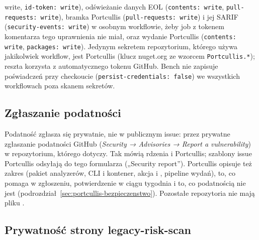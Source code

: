 \begin{itemize}
{        write}, \texttt{id-token: write}), odświeżanie danych EOL (\texttt{contents: write},
        \texttt{pull-requests: write}), bramka Portcullis (\texttt{pull-requests: write})
        i jej SARIF (\texttt{security-events: write}) w osobnym workflowie, żeby job
        z tokenem komentarza tego uprawnienia nie miał, oraz wydanie Portcullis
        (\texttt{contents: write}, \texttt{packages: write}). Jedynym sekretem
        repozytorium, którego używa jakikolwiek workflow, jest 
        Portcullis (klucz nuget.org ze wzorcem \texttt{Portcullis.*}); reszta korzysta
        z automatycznego tokenu GitHub. Bench nie zapisuje poświadczeń przy checkoucie
        (\texttt{persist-credentials: false}) we wszystkich workflowach poza skanem
        sekretów.
\end{itemize}


\subsection{Zgłaszanie podatności}\label{sec:bezpieczenstwo-zgloszenia}

Podatność zgłasza się prywatnie, nie w publicznym issue: przez prywatne zgłaszanie
podatności GitHub (\emph{Security → Advisories → Report a vulnerability}) w repozytorium,
którego dotyczy. Tak mówią  rdzenia i Portcullis; szablony issue
Portcullis odsyłają do tego formularza („Security report”). Portcullis opisuje też zakres
(pakiet analyzerów, CLI i kontener, akcja i , pipeline
wydań), to, co pomaga w zgłoszeniu, potwierdzenie w ciągu tygodnia i to, co podatnością nie
jest (podrozdział~\ref{sec:portcullis-bezpieczenstwo}). Pozostałe repozytoria nie mają
pliku .


\subsection{Prywatność strony legacy-risk-scan}\label{sec:bezpieczenstwo-risk-scan}


